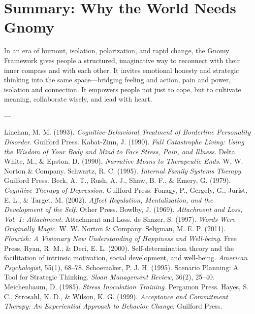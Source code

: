 \documentclass{article}
\begin{document}
\section{Summary: Why the World Needs Gnomy}
In an era of burnout, isolation, polarization, and rapid change, the Gnomy Framework gives people a structured, imaginative way to reconnect with their inner compass and with each other. It invites emotional honesty and strategic thinking into the same space—bridging feeling and action, pain and power, isolation and connection. It empowers people not just to cope, but to cultivate meaning, collaborate wisely, and lead with heart.

---

\begin{thebibliography}{99}
     Linehan, M. M. (1993). \textit{Cognitive-Behavioral Treatment of Borderline Personality Disorder}. Guilford Press.
     Kabat-Zinn, J. (1990). \textit{Full Catastrophe Living: Using the Wisdom of Your Body and Mind to Face Stress, Pain, and Illness}. Delta.
     White, M., \& Epston, D. (1990). \textit{Narrative Means to Therapeutic Ends}. W. W. Norton \& Company.
     Schwartz, R. C. (1995). \textit{Internal Family Systems Therapy}. Guilford Press.
     Beck, A. T., Rush, A. J., Shaw, B. F., \& Emery, G. (1979). \textit{Cognitive Therapy of Depression}. Guilford Press.
     Fonagy, P., Gergely, G., Jurist, E. L., \& Target, M. (2002). \textit{Affect Regulation, Mentalization, and the Development of the Self}. Other Press.
     Bowlby, J. (1969). \textit{Attachment and Loss, Vol. 1: Attachment}. Attachment and Loss.
     de Shazer, S. (1997). \textit{Words Were Originally Magic}. W. W. Norton \& Company.
     Seligman, M. E. P. (2011). \textit{Flourish: A Visionary New Understanding of Happiness and Well-being}. Free Press.
     Ryan, R. M., \& Deci, E. L. (2000). Self-determination theory and the facilitation of intrinsic motivation, social development, and well-being. \textit{American Psychologist}, 55(1), 68–78.
     Schoemaker, P. J. H. (1995). Scenario Planning: A Tool for Strategic Thinking. \textit{Sloan Management Review}, 36(2), 25–40.
     Meichenbaum, D. (1985). \textit{Stress Inoculation Training}. Pergamon Press.
     Hayes, S. C., Strosahl, K. D., \& Wilson, K. G. (1999). \textit{Acceptance and Commitment Therapy: An Experiential Approach to Behavior Change}. Guilford Press.

\end{thebibliography}
\end{document}
